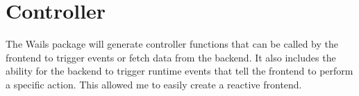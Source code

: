 \section{Controller}

The Wails package will generate controller functions that can be called by the frontend to trigger events or fetch data from the backend. It also includes the ability for the backend to trigger runtime events that tell the frontend to perform a specific action. This allowed me to easily create a reactive frontend.
